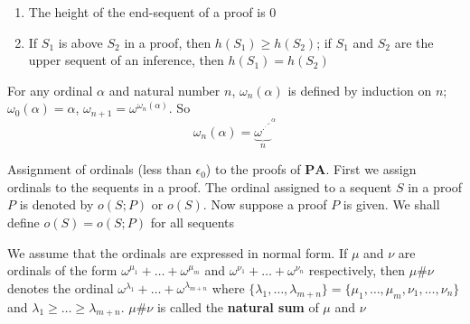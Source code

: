 \documentclass[11pt]{article}
\def \PA {\textbf{PA}}
\begin{document}
\begin{proposition}[]
\begin{enumerate}
\item The height of the end-sequent of a proof is 0
\item If \(S_1\) is above \(S_2\) in a proof, then \(h(S_1)\ge h(S_2)\); if \(S_1\) and \(S_2\) are
the upper sequent of an inference, then \(h(S_1)=h(S_2)\)
\end{enumerate}
\end{proposition}

For any ordinal \(\alpha\) and natural number \(n\), \(\omega_n(\alpha)\) is defined by induction on \(n\);
\(\omega_0(\alpha)=\alpha\), \(\omega_{n+1}=\omega^{\omega_n(\alpha)}\). So
\begin{equation*}
 \omega_n(\alpha)={\underbrace{\omega^{\cdot^{\cdot^{\cdot^{\omega}}}}}_{n}}^{^{\alpha}}
\end{equation*}

\begin{definition}[]
Assignment of ordinals (less than \(\epsilon_0\)) to the proofs of \(\PA\). First we assign
ordinals to the sequents in a proof. The ordinal assigned to a sequent \(S\) in a proof \(P\) is
denoted by \(o(S;P)\) or \(o(S)\). Now suppose a proof \(P\) is given. We shall
define \(o(S)=o(S;P)\) for all sequents
\end{definition}

We assume that the ordinals are expressed in normal form. If \(\mu\) and \(\nu\) are ordinals of the form
\(\omega^{\mu_1}+\dots+\omega^{\mu_m}\) and \(\omega^{\nu_1}+\dots+\omega^{\nu_n}\) respectively,
then \(\mu\#\nu\) denotes the ordinal \(\omega^{\lambda_1}+\dots+\omega^{\lambda_{m+n}}\) where
\(\{\lambda_1,\dots,\lambda_{m+n}\}=\{\mu_1,\dots,\mu_m,\nu_1,\dots,\nu_n\}\) and
\(\lambda_1\ge\dots\ge\lambda_{m+n}\). \(\mu\#\nu\) is called the \textbf{natural sum} of \(\mu\) and \(\nu\)
\end{document}
